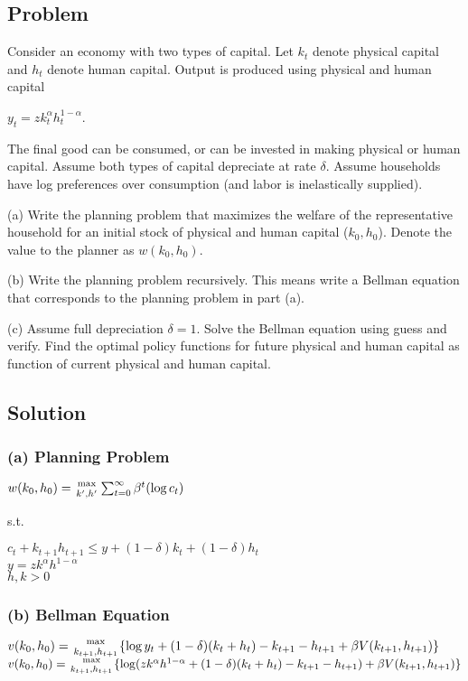 \documentclass[10pt, a4paper]{article}
\begin{document}
  \subsection*{Problem}
    Consider an economy with two types of capital. Let $k_t$ denote physical capital and $h_t$ denote human capital. Output is produced using physical and human capital
    \begin{center}
      $y_t=zk_t^{\alpha}h_t^{1-\alpha}$.
    \end{center}
    The final good can be consumed, or can be invested in making physical or human capital. Assume both types of capital depreciate at rate $\delta$. Assume households have log preferences over consumption (and labor is inelastically supplied).

    (a) Write the planning problem that maximizes the welfare of the representative household for an initial stock of physical and human capital ($k_0,h_0$). Denote the value to the planner as $w(k_0,h_0)$.

    (b) Write the planning problem recursively. This means write a Bellman equation that corresponds to the planning problem in part (a).

    (c) Assume full depreciation $\delta=1$. Solve the Bellman equation using guess and verify. Find the optimal policy functions for future physical and human capital as function of current physical and human capital.
  \subsection*{Solution}
    \subsubsection*{(a) Planning Problem}
    \begin{center}
      $w(k_0,h_0)={\max\atop{k',h'}}\sum^{\infty}_{t=0}\beta^t(\log c_t)$ \\
    \end{center}
    s.t.
    \begin{center}
      $c_t+k_{t+1}h_{t+1}\leq y+(1-\delta)k_t+(1-\delta)h_t$ \\
      $y=zk^{\alpha}h^{1-\alpha}$ \\
      $h,k>0$
    \end{center}
    \subsubsection*{(b) Bellman Equation}
    \begin{center}
      $v(k_0,h_0) = {\max\atop{k_{t+1},h_{t+1}}}\{\log y_t+(1-\delta)(k_t+h_t)-k_{t+1}-h_{t+1}+\beta V(k_{t+1},h_{t+1})\}$ \\
      $v(k_0,h_0) = {\max\atop{k_{t+1},h_{t+1}}}\{\log(zk^{\alpha}h^{1-\alpha}+(1-\delta)(k_t+h_t)-k_{t+1}-h_{t+1})+\beta V(k_{t+1},h_{t+1})\}$
    \end{center}
\end{document}
